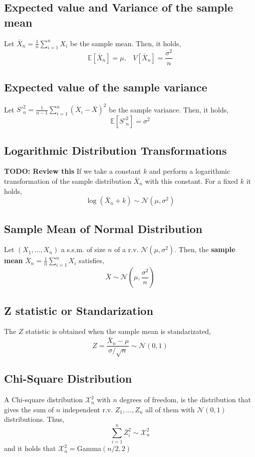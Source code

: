 \subsection{Expected value and Variance of the sample mean}
Let $\bar{X}_n = \frac{1}{n}\sum_{i=1}^n X_i$ be the sample mean. Then, it holds,
\[ \mathbb{E}[\bar{X}_n] = \mu,\;\;\; V[\bar{X}_n] = \frac{\sigma^2}{n} \]

\subsection{Expected value of the sample variance}
Let $S'^2_n = \frac{1}{n-1}\sum_{i=1}^{n} (X_i-\bar{X})^2 $ be the sample variance. Then, it holds,
\[ \mathbb{E}[S'^2_n] = \sigma^2 \]

\subsection{Logarithmic Distribution Transformations}
\textbf{TODO: Review this}
If we take a constant $k$ and perform a logarithmic transformation of the sample distribution $\bar{X}_n$ with this constant. For a fixed $k$ it holds,
\[ \log(\bar{X}_n + k) \sim \mathcal{N}(\mu, \sigma^2) \]

\subsection{Sample Mean of Normal Distribution}
Let $(X_1,\dots,X_n)$ a s.s.m. of size $n$ of a r.v. $\mathcal{N}(\mu,\sigma^2)$. Then, the \textbf{sample mean} $\bar{X}_n = \frac{1}{n}\sum_{i=1}^n X_i$
satisfies,
\[ \bar{X} \sim \mathcal{N}(\mu,\frac{\sigma^2}{n}) \]

\subsection{Z statistic or Standarization}
The $Z$ statistic is obtained when the sample mean is standarizated,
\[ Z = \frac{\bar{X}_n - \mu}{\sigma / \sqrt{n}} \sim \mathcal{N}(0,1) \]

\subsection{Chi-Square Distribution}
A Chi-square distribution $\mathcal{X}_n^2$ with $n$ degrees of freedom, is the distribution that gives the sum of $n$ independent r.v. $Z_1,\dots,Z_n$ all of
them with $\mathcal{N}(0,1)$ distributions. Thus,
\[ \sum_{i=1}^n Z_i^2 \sim \mathcal{X}_n^2 \]
and it holds that $\mathcal{X}^2_n = $Gamma$(n/2,2)$

